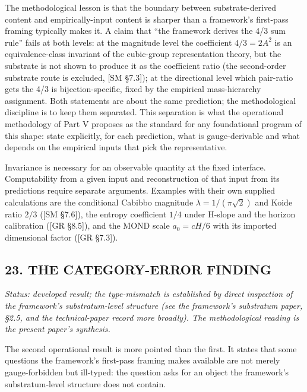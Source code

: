 \documentclass[
]{article}
\begin{document}
The methodological lesson is that the boundary between substrate-derived
content and empirically-input content is sharper than a framework's
first-pass framing typically makes it. A claim that ``the framework
derives the 4/3 sum rule'' fails at both levels: at the magnitude level
the coefficient \(4/3 = 2A^2\) is an equivalence-class invariant of the
cubic-group representation theory, but the substrate is not shown to
produce it as the coefficient ratio (the second-order substrate route is
excluded, {[}SM §7.3{]}); at the directional level which pair-ratio gets
the 4/3 is bijection-specific, fixed by the empirical mass-hierarchy
assignment. Both statements are about the same prediction; the
methodological discipline is to keep them separated. This separation is
what the operational methodology of Part V proposes as the standard for
any foundational program of this shape: state explicitly, for each
prediction, what is gauge-derivable and what depends on the empirical
inputs that pick the representative.

Invariance is necessary for an observable quantity at the fixed
interface. Computability from a given input and reconstruction of that
input from its predictions require separate arguments. Examples with
their own supplied calculations are the conditional Cabibbo magnitude
\(\lambda=1/(\pi\sqrt{2})\) and Koide ratio \(2/3\) ({[}SM §7.6{]}), the
entropy coefficient \(1/4\) under H-slope and the horizon calibration
({[}GR §8.5{]}), and the MOND scale \(a_0=cH/6\) with its imported
dimensional factor ({[}GR §7.3{]}).

\hypertarget{the-category-error-finding}{%
\subsection{23. THE CATEGORY-ERROR
FINDING}\label{the-category-error-finding}}

\emph{Status: developed result; the type-mismatch is established by
direct inspection of the framework's substratum-level structure (see the
framework's substratum paper, §2.5, and the technical-paper record more
broadly). The methodological reading is the present paper's synthesis.}

The second operational result is more pointed than the first. It states
that some questions the framework's first-pass framing makes available
are not merely gauge-forbidden but ill-typed: the question asks for an
object the framework's substratum-level structure does not contain.
\end{document}
